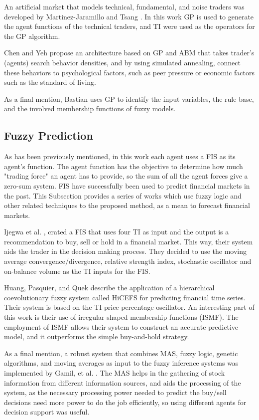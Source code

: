 \documentclass[a4paper,twoside]{article}
\begin{document}
An artificial market that models technical, fundamental, and noise traders was developed by Martinez-Jaramillo and Tsang \cite{Martinez-Jaramillo2009}. In this work GP is used to generate the agent functions \cite{russell2003artificial} of the technical traders, and TI were used as the operators for the GP algorithm.

Chen and Yeh \cite{Chen2001} propose an architecture based on GP and ABM that takes trader's (agents) search behavior densities, and by using simulated annealing, connect these behaviors to psychological factors, such as peer pressure or economic factors such as the standard of living.

As a final mention, Bastian \cite{Bastian2000} uses GP to identify the input variables, the rule base, and the involved membership functions of fuzzy models.

\subsection{Fuzzy Prediction}
\label{fuzzy-prediction}

As has been previously mentioned, in this work each agent uses a FIS as its agent's function. The agent function has the objective to determine how much "trading force" an agent has to provide, so the sum of all the agent forces give a zero-sum system. FIS have successfully been used to predict financial markets in the past. This Subsection provides a series of works which use fuzzy logic and other related techniques to the proposed method, as a mean to forecast financial markets.

Ijegwa et al. \cite{Ijegwa2014}, crated a FIS that uses four TI as input and the output is a recommendation to buy, sell or hold in a financial market. This way, their system aids the trader in the decision making process. They decided to use the moving average convergence/divergence, relative strength index, stochastic oscillator and on-balance volume as the TI inputs for the FIS.

Huang, Pasquier, and Quek \cite{Huang2009} describe the application of a hierarchical coevolutionary fuzzy system called HiCEFS for predicting financial time series. Their system is based on the TI price percentage oscillator. An interesting part of this work is their use of irregular shaped membership functions (ISMF). The employment of ISMF allows their system to construct an accurate predictive model, and it outperforms the simple buy-and-hold strategy.

As a final mention, a robust system that combines MAS, fuzzy logic, genetic algorithms, and moving averages as input to the fuzzy inference systems was implemented by Gamil, et al. \cite{Gamil2007}. The MAS helps in the gathering of stock information from different information sources, and aids the processing of the system, as the necessary processing power needed to predict the buy/sell decisions need more power to do the job efficiently, so using different agents for decision support was useful.
\end{document}

